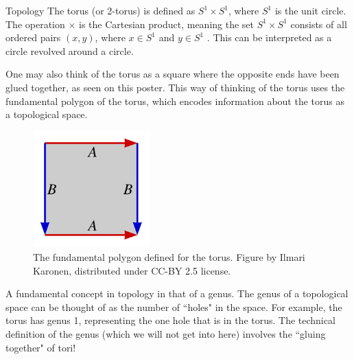 \documentclass{beamer}
\newlength{\colwidth}
\begin{document}
\begin{frame}[t]
\begin{columns}[t]
\begin{column}{\colwidth}
\begin{block}{Topology}
The torus (or 2-torus) is defined as \( S^1 \times S^1 \), where \(S^1\) is the unit circle. The operation \( \times \) is the Cartesian product, meaning the set \( S^1 \times S^1 \) consists of all ordered pairs \( (x,y) \), where \(x\in S^1\) and \(y\in S^1\) \autocite{morris1989topology}. This can be interpreted as a circle revolved around a circle.

One may also think of the torus as a square where the opposite ends have been glued together, as seen on this poster. This way of thinking of the torus uses the fundamental polygon of the torus, which encodes information about the torus as a topological space.

\begin{figure}
    \centering
    \includegraphics[width=0.4\textwidth]{figures/torus square.png}
    \caption{The fundamental polygon defined for the torus. Figure by Ilmari Karonen, distributed under CC-BY 2.5 license.}
    \label{fig:torus_square}
\end{figure}

A fundamental concept in topology in that of a genus. The genus of a topological space can be thought of as the number of ``holes" in the space. For example, the torus has genus 1, representing the one hole that is in the torus. The technical definition of the genus (which we will not get into here) involves the ``gluing together" of tori!


\end{block}
\end{column}
\end{columns}
\end{frame}
\end{document}
